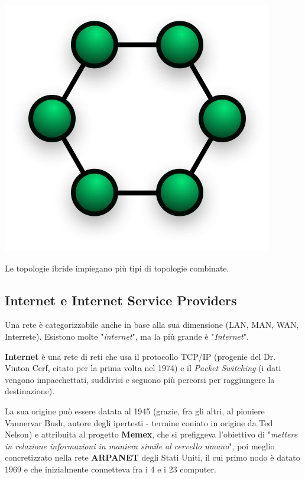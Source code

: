 \begin{itemize}
            \begin{center}
                \includegraphics[scale=0.25]{images/RingNetwork.png}
            \end{center}
        \end{itemize}
        
        Le topologie ibride impiegano più tipi di topologie combinate.
    
    \subsection{Internet e Internet Service Providers}
    
        Una rete è categorizzabile anche in base alla sua dimensione (LAN, MAN, WAN, Interrete). Esistono molte "\textit{internet}", ma la più grande è "\textit{Internet}".
    
        \textbf{Internet} è una rete di reti che usa il protocollo TCP/IP (progenie del Dr. Vinton Cerf, citato per la prima volta nel 1974) e il \textit{Packet Switching} (i dati vengono impacchettati, suddivisi e seguono più percorsi per raggiungere la destinazione). 
        
        \vspace{3mm}
        
        La sua origine può essere datata al 1945 (grazie, fra gli altri, al pioniere Vannervar Bush, autore degli ipertesti - termine coniato in origine da Ted Nelson) e attribuita al progetto \textbf{Memex}, che si prefiggeva l'obiettivo di "\textit{mettere in relazione informazioni in maniera simile al cervello umano}", poi meglio concretizzato nella rete \textbf{ARPANET} degli Stati Uniti, il cui primo nodo è datato 1969 e che inizialmente connetteva fra i 4 e i 23 computer.
        
